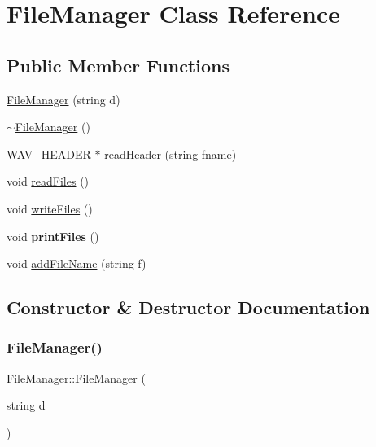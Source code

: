 \hypertarget{classFileManager}{}\section{File\+Manager Class Reference}
\label{classFileManager}
\subsection*{Public Member Functions}
\begin{DoxyCompactItemize}
\item 
\hyperlink{classFileManager_af7cd3220d7b6b4c78900e591568019b7}{File\+Manager} (string d)
\item 
\hyperlink{classFileManager_abaed33b5b0c13b8a597db9335a1aacfa}{$\sim$\+File\+Manager} ()
\item 
\hyperlink{structWAV__HEADER}{W\+A\+V\+\_\+\+H\+E\+A\+D\+ER} $\ast$ \hyperlink{classFileManager_a2db2e663db1df9cc19983f1bc642cf3a}{read\+Header} (string fname)
\item 
void \hyperlink{classFileManager_a2161783ca1618e76cf37dec25687ea5a}{read\+Files} ()
\item 
void \hyperlink{classFileManager_a8c9d83a8d5e00e0f33e9c7bc64ab7c15}{write\+Files} ()
\item 
\mbox{\label{classFileManager_aaf4a013cb2117f81cb2c2492b1f364b9}} 
void {\bfseries print\+Files} ()
\item 
void \hyperlink{classFileManager_acc1a9a9b7f5d6009fe953db4cc3b80bd}{add\+File\+Name} (string f)
\end{DoxyCompactItemize}


\subsection{Constructor \& Destructor Documentation}
\mbox{\label{classFileManager_af7cd3220d7b6b4c78900e591568019b7}} 
\subsubsection{\texorpdfstring{File\+Manager()}{FileManager()}}
{\footnotesize\ttfamily File\+Manager\+::\+File\+Manager (\begin{DoxyParamCaption}\item[{string}]{d }\end{DoxyParamCaption})}

